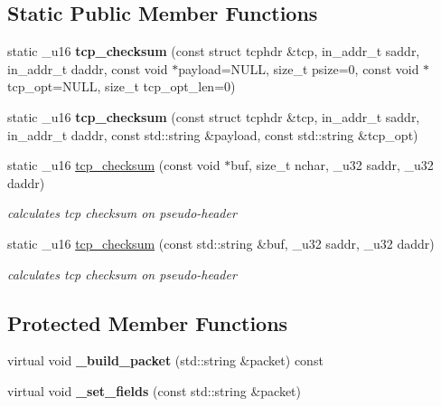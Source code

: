 \subsection*{Static Public Member Functions}
\begin{CompactItemize}
\item 
\hypertarget{classsocketpp_1_1TCP__RawSocket_91cf9d3aaf57d50ba1e26c8621083728}{
static \_\-u16 \textbf{tcp\_\-checksum} (const struct tcphdr \&tcp, in\_\-addr\_\-t saddr, in\_\-addr\_\-t daddr, const void $\ast$payload=NULL, size\_\-t psize=0, const void $\ast$tcp\_\-opt=NULL, size\_\-t tcp\_\-opt\_\-len=0)}
\label{classsocketpp_1_1TCP__RawSocket_91cf9d3aaf57d50ba1e26c8621083728}

\item 
\hypertarget{classsocketpp_1_1TCP__RawSocket_237a9811c114b7d38e41e9d65265b4cd}{
static \_\-u16 \textbf{tcp\_\-checksum} (const struct tcphdr \&tcp, in\_\-addr\_\-t saddr, in\_\-addr\_\-t daddr, const std::string \&payload, const std::string \&tcp\_\-opt)}
\label{classsocketpp_1_1TCP__RawSocket_237a9811c114b7d38e41e9d65265b4cd}

\item 
static \_\-u16 \hyperlink{classsocketpp_1_1TCP__RawSocket_a0d080dc7c3318b854801d9d8887683c}{tcp\_\-checksum} (const void $\ast$buf, size\_\-t nchar, \_\-u32 saddr, \_\-u32 daddr)
\begin{CompactList}\small\item\em calculates tcp checksum on pseudo-header \item\end{CompactList}\item 
static \_\-u16 \hyperlink{classsocketpp_1_1TCP__RawSocket_1ac43948171803538577ca50dcd86402}{tcp\_\-checksum} (const std::string \&buf, \_\-u32 saddr, \_\-u32 daddr)
\begin{CompactList}\small\item\em calculates tcp checksum on pseudo-header \item\end{CompactList}\end{CompactItemize}
\subsection*{Protected Member Functions}
\begin{CompactItemize}
\item 
\hypertarget{classsocketpp_1_1TCP__RawSocket_bc5c2885494099eb5371d8e15cfce054}{
virtual void \textbf{\_\-build\_\-packet} (std::string \&packet) const }
\label{classsocketpp_1_1TCP__RawSocket_bc5c2885494099eb5371d8e15cfce054}

\item 
\hypertarget{classsocketpp_1_1TCP__RawSocket_6976a4726503eef03a8d446afdbaddbe}{
virtual void \textbf{\_\-set\_\-fields} (const std::string \&packet)}
\label{classsocketpp_1_1TCP__RawSocket_6976a4726503eef03a8d446afdbaddbe}

\end{CompactItemize}

